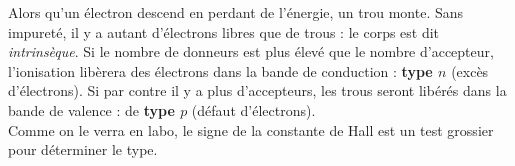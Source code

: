 		Alors qu'un électron descend en perdant de l'énergie, un trou monte. Sans impureté, 
		il y a autant d'électrons libres que de trous : le corps est dit \textit{intrinsèque}. 
		Si le nombre de donneurs est plus élevé que le nombre d'accepteur, l'ionisation 
		libèrera des électrons dans la bande de conduction : \textbf{type $n$} (excès d'électrons). 
		Si par contre il y a plus d'accepteurs, les trous seront libérés dans la bande de valence :
		de \textbf{type $p$} (défaut d'électrons).\\
		Comme on le verra en labo, le signe de la constante de Hall est un test grossier 
		pour déterminer le type.
		
		
		
		
		
		
		
		
		
		
		
		
		
		
		
		
		
		
		
		
		
		
		
		
		
		
		
		
		
		
		
